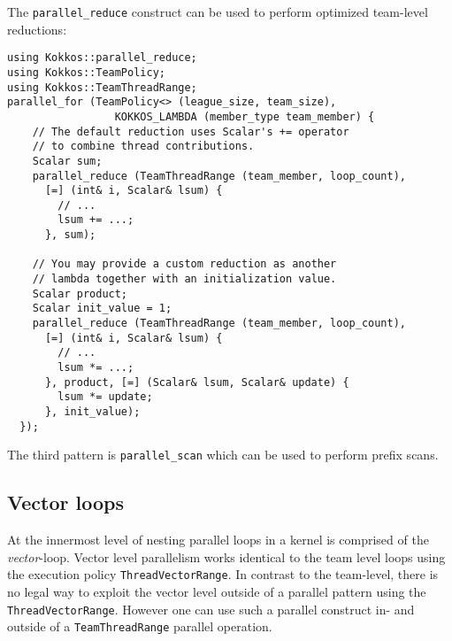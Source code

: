 The \lstinline|parallel_reduce| construct can be used to perform optimized team-level reductions:

\begin{lstlisting}
using Kokkos::parallel_reduce;
using Kokkos::TeamPolicy;
using Kokkos::TeamThreadRange;
parallel_for (TeamPolicy<> (league_size, team_size),
                 KOKKOS_LAMBDA (member_type team_member) {
    // The default reduction uses Scalar's += operator
    // to combine thread contributions.
    Scalar sum;
    parallel_reduce (TeamThreadRange (team_member, loop_count), 
      [=] (int& i, Scalar& lsum) {
        // ... 
        lsum += ...;
      }, sum);

    // You may provide a custom reduction as another
    // lambda together with an initialization value.
    Scalar product;
    Scalar init_value = 1;
    parallel_reduce (TeamThreadRange (team_member, loop_count), 
      [=] (int& i, Scalar& lsum) {
        // ...
        lsum *= ...;
      }, product, [=] (Scalar& lsum, Scalar& update) {
        lsum *= update; 
      }, init_value);
  });
\end{lstlisting}

The third pattern is \lstinline|parallel_scan| which can be used to perform prefix scans.

\subsection{Vector loops}\label{SS:Hierarchical:Nested:Loops:Vector}

At the innermost level of nesting parallel loops in a kernel is comprised of the \emph{vector}-loop.
Vector level parallelism works identical to the team level loops using the execution policy \lstinline|ThreadVectorRange|.
In contrast to the team-level, there is no legal way to exploit the vector level outside of a parallel pattern using the \lstinline|ThreadVectorRange|. 
However one can use such a parallel construct in- and outside of a \lstinline|TeamThreadRange| parallel operation. 

